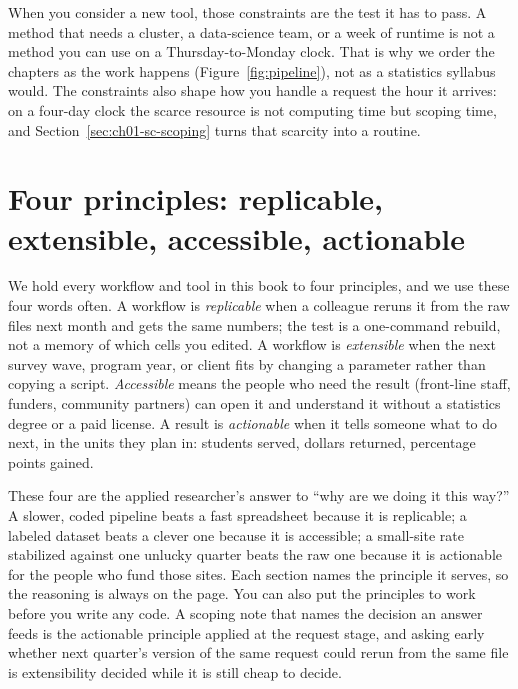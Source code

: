 \documentclass[
    a4paper,
    fontsize=10pt,
    twoside=true,
    numbers=noenddot,
]{kaobook}
\begin{document}
When you consider a new tool, those constraints are the test it has to pass. A method that needs a cluster, a data-science team, or a week of runtime is not a method you can use on a Thursday-to-Monday clock. That is why we order the chapters as the work happens (Figure~\ref{fig:pipeline}), not as a statistics syllabus would. The constraints also shape how you handle a request the hour it arrives: on a four-day clock the scarce resource is not computing time but scoping time, and Section~\ref{sec:ch01-sc-scoping} turns that scarcity into a routine.

\section{Four principles: replicable, extensible, accessible, actionable}\label{sec:principles}
We hold every workflow and tool in this book to four principles, and we use these four words often. A workflow is \emph{replicable} when a colleague reruns it from the raw files next month and gets the same numbers; the test is a one-command rebuild, not a memory of which cells you edited. A workflow is \emph{extensible} when the next survey wave, program year, or client fits by changing a parameter rather than copying a script. \emph{Accessible} means the people who need the result (front-line staff, funders, community partners) can open it and understand it without a statistics degree or a paid license. A result is \emph{actionable} when it tells someone what to do next, in the units they plan in: students served, dollars returned, percentage points gained.

These four are the applied researcher's answer to \enquote{why are we doing it this way?} A slower, coded pipeline beats a fast spreadsheet because it is replicable; a labeled dataset beats a clever one because it is accessible; a small-site rate stabilized against one unlucky quarter beats the raw one because it is actionable for the people who fund those sites. Each section names the principle it serves, so the reasoning is always on the page. You can also put the principles to work before you write any code. A scoping note that names the decision an answer feeds is the actionable principle applied at the request stage, and asking early whether next quarter's version of the same request could rerun from the same file is extensibility decided while it is still cheap to decide.
\end{document}
